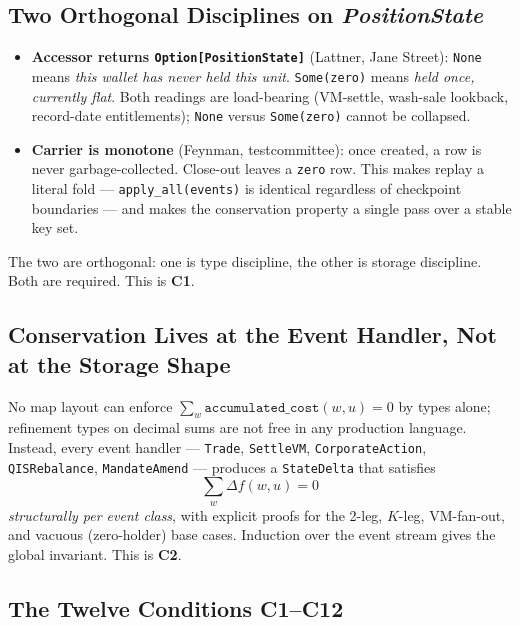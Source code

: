 \documentclass[11pt,a4paper]{article}
\begin{document}
\subsection{Two Orthogonal Disciplines on \textit{PositionState}}

\begin{itemize}[leftmargin=*]
\item \textbf{Accessor returns \texttt{Option[PositionState]}} (Lattner, Jane Street): \texttt{None} means \emph{this wallet has never held this unit}. \texttt{Some(zero)} means \emph{held once, currently flat}. Both readings are load-bearing (VM-settle, wash-sale lookback, record-date entitlements); \texttt{None} versus \texttt{Some(zero)} cannot be collapsed.
\item \textbf{Carrier is monotone} (Feynman, testcommittee): once created, a row is never garbage-collected. Close-out leaves a \texttt{zero} row. This makes replay a literal fold --- \texttt{apply\_all(events)} is identical regardless of checkpoint boundaries --- and makes the conservation property a single pass over a stable key set.
\end{itemize}

\noindent The two are orthogonal: one is type discipline, the other is storage discipline. Both are required. This is \textbf{C1}.

\subsection{Conservation Lives at the Event Handler, Not at the Storage Shape}

No map layout can enforce $\sum_w \texttt{accumulated\_cost}(w, u) = 0$ by types alone; refinement types on decimal sums are not free in any production language. Instead, every event handler --- \texttt{Trade}, \texttt{SettleVM}, \texttt{CorporateAction}, \texttt{QISRebalance}, \texttt{MandateAmend} --- produces a \texttt{StateDelta} that satisfies
\[
\sum_w \Delta f(w, u) = 0
\]
\emph{structurally per event class}, with explicit proofs for the 2-leg, $K$-leg, VM-fan-out, and vacuous (zero-holder) base cases. Induction over the event stream gives the global invariant. This is \textbf{C2}.

\subsection{The Twelve Conditions C1--C12}
\end{document}
